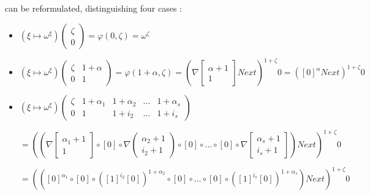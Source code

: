 \documentclass[10pt]{article}
\begin{document}
can be reformulated, distinguishing four cases :

\begin{itemize}

\item 
\( (\xi \mapsto \omega^\xi) \begin{pmatrix} \zeta \\
                                            0     \end{pmatrix} = \varphi(0,\zeta) = \omega^\zeta \)

\item 
\( (\xi \mapsto \omega^\xi) \begin{pmatrix} \zeta & 1+\alpha \\
                                            0     & 1        \end{pmatrix} = \varphi(1+\alpha,\zeta) 
= (\nabla \begin{bmatrix} \alpha+1 \\
                          1        \end{bmatrix} Next)^{1+\zeta} 0 = ([0]^\alpha Next)^{1+\zeta} 0 \)

\item 
\( (\xi \mapsto \omega^\xi) \begin{pmatrix} \zeta & 1+\alpha_1 & 1+\alpha_2 & \ldots & 1+\alpha_s \\
                                                  0     & 1          & 1+i_2      & \ldots & 1+i_s      \end{pmatrix} \)

\( = ((\nabla \begin{bmatrix} \alpha_1+1 \\
                              1          \end{bmatrix} \circ [0] \circ \nabla \begin{pmatrix} \alpha_2+1 \\
                                                                                              i_2+1      \end{pmatrix} \circ [0] \circ \ldots \circ [0] \circ \nabla \begin{bmatrix} \alpha_s+1 \\
                                                                                                                                                                                     i_s+1      \end{bmatrix}) Next)^{1+\zeta} 0 \)

\( = (([0]^{\alpha_1} \circ [0] \circ ([1]^{i_2} [0])^{1+\alpha_2} \circ [0] \circ \ldots \circ [0] \circ ([1]^{i_s} [0])^{1+\alpha_s}) Next)^{1+\zeta} 0 \) 


\end{itemize}
\end{document}
